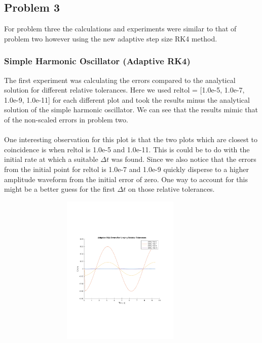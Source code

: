 \documentclass{article}
\begin{document}
\subsection{Problem 3}
For problem three the calculations and experiments were similar to that of problem two however using the new adaptive step size RK4 method.\\

\subsubsection{Simple Harmonic Oscillator (Adaptive RK4)}
The first experiment was calculating the errors compared to the analytical solution for different relative tolerances. Here we used reltol = [1.0e-5, 1.0e-7, 1.0e-9, 1.0e-11] for each different plot and took the results minus the analytical solution of the simple harmonic oscillator. We can see that the results mimic that of the non-scaled errors in problem two.\\
\\
One interesting observation for this plot is that the two plots which are closest to coincidence is when reltol is 1.0e-5 and 1.0e-11. This is could be to do with the initial rate at which a suitable $\Delta t$ was found. Since we also notice that the errors from the initial point for reltol is 1.0e-7 and 1.0e-9 quickly disperse to a higher amplitude waveform from the initial error of zero. One way to account for this might be a better guess for the first $\Delta t$ on those relative tolerances.
\begin{figure}[!h]
    \centering
    \includegraphics[width=10cm, height=7.2cm]
    {figures/adaptiveRK4_sho_err.pdf}
\end{figure}
\end{document}
